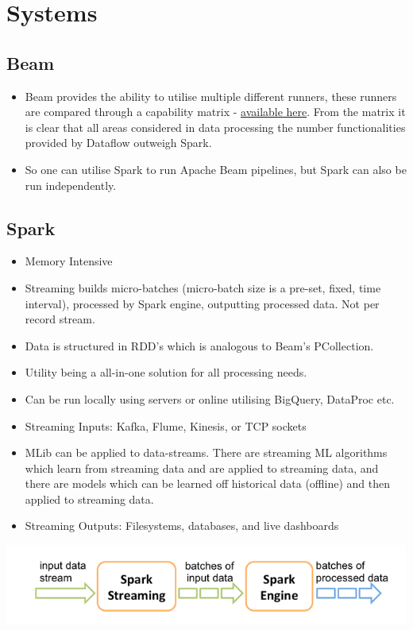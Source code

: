 \documentclass[english]{article}
\begin{document}
\section{Systems}
\subsection{Beam}
\begin{itemize}
\item Beam provides the ability to utilise multiple different runners, these runners are compared through a capability matrix - \href{https://beam.apache.org/documentation/runners/capability-matrix/}{available here}. From the matrix it is clear that all areas considered in data processing the number functionalities provided by Dataflow outweigh Spark.
\item So one can utilise Spark to run Apache Beam pipelines, but Spark can also be run independently.
\end{itemize}
\subsection{Spark}
\begin{itemize}
\item Memory Intensive
\item Streaming builds micro-batches (micro-batch size is a pre-set, fixed, time interval), processed by Spark engine, outputting processed data. Not per record stream.
\item Data is structured in RDD's which is analogous to Beam's PCollection.
\item Utility being a all-in-one solution for all processing needs.
\item Can be run locally using servers or online utilising BigQuery, DataProc etc.
\item Streaming Inputs: Kafka, Flume, Kinesis, or TCP sockets
\item MLib can be applied to data-streams. There are streaming ML algorithms which learn from streaming data and are applied to streaming data, and there are models which can be learned off historical data (offline) and then applied to streaming data.
\item Streaming Outputs: Filesystems, databases, and live dashboards
\end{itemize}
\includegraphics[scale=0.5]{spark_streaming_model.png}
\\\\
\end{document}
